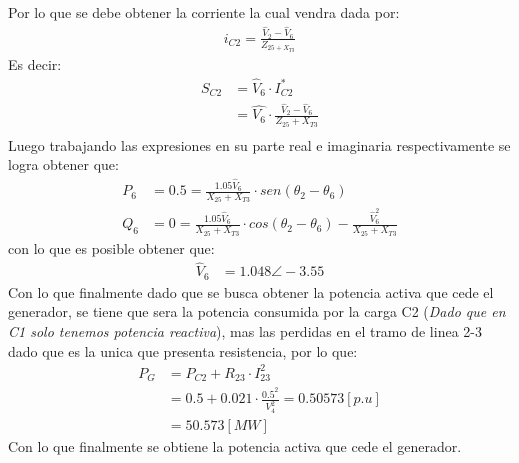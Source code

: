 \documentclass[
  11pt,
  letterpaper,
   addpoints,
   answers
  ]{exam}
\begin{document}
\begin{questions}
\begin{solution}
        Por lo que se debe obtener la corriente la cual vendra dada por:
        \begin{align}
            i_{C2} = \frac{\hat{V}_{2} - \hat{V}_{6}}{Z_{25 + X_{T3}}}
        \end{align}
        Es decir:
        \begin{align}
            S_{C2} &= \hat{V}_{6} \cdot I_{C2}^{*}\\
                   &= \hat{V_{6}} \cdot \frac{\hat{V}_{2} - \hat{V}_{6}}{Z_{25} + X_{T3}}\\ 
        \end{align}
        Luego trabajando las expresiones en su parte real e imaginaria respectivamente se logra obtener que:
        \begin{align}
            P_{6} &= 0.5 = \frac{1.05 \hat{V}_{6}}{X_{25} + X_{T3}} \cdot sen(\theta_{2} - \theta_{6})\\
            Q_{6} & = 0  =\frac{1.05 \hat{V}_{6}}{X_{25} + X_{T3}} \cdot cos(\theta_{2} - \theta_{6}) - \frac{\hat{V}_{6}^{2}}{X_{25} + X_{T3}} 
        \end{align}
        con lo que es posible obtener que:
        \begin{align}
            \hat{V}_{6} &= 1.048 \angle -3.55
        \end{align}
        Con lo que finalmente dado que se busca obtener la potencia activa que cede el generador, se tiene que sera la potencia consumida por la carga C2 (\textit{Dado que en C1 solo tenemos potencia reactiva}), mas las perdidas en el tramo de linea 2-3 dado que es la unica que presenta resistencia, por lo que:
        \begin{align}
            P_{G} &= P_{C2} + R_{23} \cdot I_{23}^{2}\\
                  &= 0.5 + 0.021 \cdot \frac{0.5^{2}}{V_{4}^{2}} = 0.50573[p.u]\\
                  &= 50.573[MW]  
        \end{align}
        Con lo que finalmente se obtiene la potencia activa que cede el generador.
    
       
    \end{solution}
\end{questions}
\newpage
\end{document}
